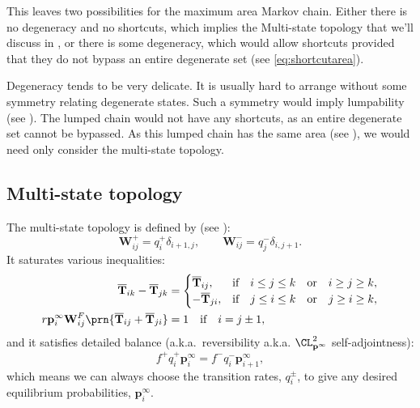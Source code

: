 \documentclass[12pt]{article}
\newcommand{\eq}{\mathbf{p}^\infty}
\newcommand{\fpt}{\mathbf{T}}
\newcommand{\fptb}{\overline{\fpt}}
\newcommand{\W}{\mathbf{W}}
\begin{document}
This leaves two possibilities for the maximum area Markov chain.
Either there is no degeneracy and no shortcuts, which implies the Multi-state topology that we'll discuss in , or there is some degeneracy, which would allow shortcuts provided that they do not bypass an entire degenerate set (see \eqref{eq:shortcutarea}).

Degeneracy tends to be very delicate. It is usually hard to arrange without some symmetry relating degenerate states. Such a symmetry would imply lumpability (see ). The lumped chain would not have any shortcuts, as an entire degenerate set cannot be bypassed. As this lumped chain has the same area (see ), we would need only consider the multi-state topology.


\subsection{Multi-state topology}\label{sec:multistate}

The multi-state topology is defined by (see \cite{amit1994learning,Fusi2007multistate}):
%
\begin{equation}\label{eq:multistatedef}
  \W^+_{ij} = q^+_i \delta_{i+1,j},
  \qquad
  \W^-_{ij} = q^-_j \delta_{i,j+1}.
\end{equation}
%
It saturates various inequalities:
%
\begin{equation}\label{eq:multistateineq}
  \begin{aligned}
    \fptb_{ik} - \fptb_{jk} &=
      \begin{cases}
        \fptb_{ij},  &\text{if}\quad i \leq j \leq k \quad\text{or}\quad i \geq j \geq k,\\
        -\fptb_{ji}, &\text{if}\quad j \leq i \leq k \quad\text{or}\quad j \geq i \geq k,\\
      \end{cases} \\
    r\eq_i \W^F_{ij} \prn{\fptb_{ij}+\fptb_{ji}} &= 1 \quad\text{if}\quad i=j\pm1,
  \end{aligned}
\end{equation}
%
and it satisfies detailed balance (a.k.a.\ reversibility a.k.a. $\CL^2_{\eq}$ self-adjointness):
%
\begin{equation}\label{eq:multistateprob}
  f^+ q^+_i \eq_i = f^- q^-_i \eq_{i+1},
\end{equation}
%
which means we can always choose the transition rates, $q^\pm_i$, to give any desired equilibrium probabilities, $\eq_i$.
\end{document}
